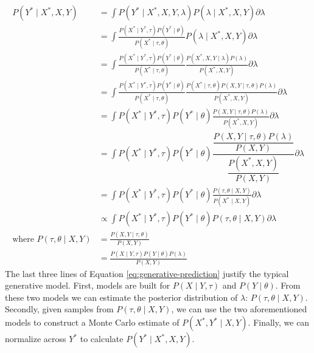 \documentclass{article}
\begin{document}
\begin{equation}
\label{eq:generative-prediction}
\begin{aligned}
P \left( Y^{*} \mid X^{*}, X, Y \right) &= \int P \left( Y^{*} \mid X^{*}, X, Y, \lambda \right) P \left( \lambda \mid X^{*}, X, Y \right) \partial \lambda\\
&= \int \frac{P \left( X^{*} \mid Y^{*}, \tau \right) P \left( Y^{*} \mid \theta \right)}{ P \left( X^{*} \mid \tau, \theta \right) } P \left( \lambda \mid X^{*}, X, Y \right) \partial \lambda\\
&= \int \frac{P \left( X^{*} \mid Y^{*}, \tau \right) P \left( Y^{*} \mid \theta \right)}{ P \left( X^{*} \mid \tau, \theta \right)} \frac{P \left( X^{*}, X, Y \mid \lambda \right) P \left( \lambda \right)}{P \left( X^{*}, X, Y \right)} \partial \lambda\\
&= \int \frac{P \left( X^{*} \mid Y^{*}, \tau \right) P \left( Y^{*} \mid \theta \right)}{ P \left( X^{*} \mid \tau, \theta \right) } \frac{P \left( X^{*} \mid \tau, \theta \right) P \left( X, Y \mid \tau, \theta \right) P \left( \lambda \right)}{P \left( X^{*}, X, Y \right)} \partial \lambda\\
&= \int P \left( X^{*} \mid Y^{*}, \tau \right) P \left( Y^{*} \mid \theta \right) \frac{ P \left( X, Y \mid \tau, \theta \right) P \left( \lambda \right)}{P \left( X^{*}, X, Y \right)} \partial \lambda\\
&= \int P \left( X^{*} \mid Y^{*}, \tau \right) P \left( Y^{*} \mid \theta \right) \dfrac{ \dfrac{P \left( X, Y \mid \tau, \theta \right) P \left( \lambda \right)}{P \left( X, Y \right)}}{\dfrac{P \left( X^{*}, X, Y \right)}{P \left( X, Y \right)}} \partial \lambda\\
&= \int P \left( X^{*} \mid Y^{*}, \tau \right) P \left( Y^{*} \mid \theta \right) \frac{ P \left( \tau, \theta \mid X, Y \right) }{P \left( X^{*} \mid X, Y \right)} \partial \lambda\\
&\propto \int P \left( X^{*} \mid Y^{*}, \tau \right) P \left( Y^{*} \mid \theta \right) P \left( \tau, \theta \mid X, Y \right) \partial \lambda\\
\textrm{where } P \left( \tau, \theta \mid X, Y \right) &= \frac{P \left( X, Y \mid \tau, \theta \right)}{P \left( X, Y \right)}\\
&= \frac{P \left( X \mid Y, \tau \right) P \left( Y \mid \theta \right) P \left( \lambda \right)}{P \left( X, Y \right)}
\end{aligned}
\end{equation}
The last three lines of Equation \ref{eq:generative-prediction} justify the  typical generative model. First, models are built for $P \left( X \mid Y, \tau \right)$ and $P \left( Y \mid \theta \right)$. From these two models we can estimate the posterior distribution of $\lambda$: $P \left( \tau, \theta \mid X, Y \right)$. Secondly, given samples from $P \left( \tau, \theta \mid X, Y \right)$, we can use the two aforementioned models to construct a Monte Carlo estimate of $P \left( X^{*}, Y^{*} \mid X, Y \right)$. Finally, we can normalize across $Y^{*}$ to calculate $P \left( Y^{*} \mid X^{*}, X, Y \right)$.
\end{document}
